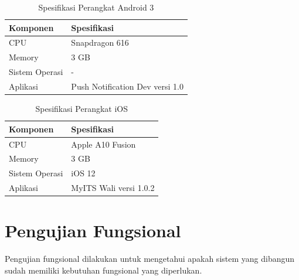 \begin{longtable}{|p{3cm}|p{6cm}|}
\caption{Spesifikasi Perangkat Android 3} \label{t:spec-android-3} \\ \hline
\rowcolor{lightgray} Komponen & Spesifikasi \\ \hline
CPU & Snapdragon 616 \\ \hline
Memory & 3 GB \\ \hline
Sistem Operasi & - \\ \hline
Aplikasi & Push Notification Dev versi 1.0 \\ \hline
\end{longtable}
\begin{longtable}{|p{3cm}|p{6cm}|}
	\caption{Spesifikasi Perangkat iOS} \label{t:spec-ios} \\ \hline
	\rowcolor{lightgray} Komponen & Spesifikasi \\ \hline
    CPU & Apple A10 Fusion \\ \hline
    Memory & 3 GB \\ \hline
    Sistem Operasi & iOS 12 \\ \hline
    Aplikasi & MyITS Wali versi 1.0.2 \\ \hline
\end{longtable}

\section{Pengujian Fungsional}
\par Pengujian fungsional dilakukan untuk mengetahui apakah sistem yang dibangun sudah memiliki kebutuhan fungsional yang diperlukan.

